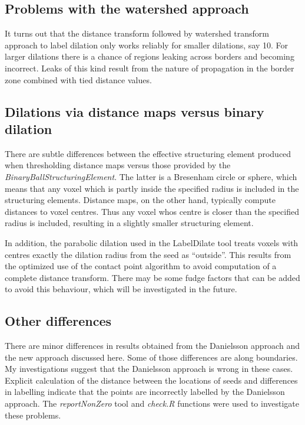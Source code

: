 \documentclass{InsightArticle}
\begin{document}
\subsection{Problems with the watershed approach}
It turns out that the distance transform followed by watershed
transform approach to label dilation only works reliably for smaller
dilations, say 10. For larger dilations there is a chance of regions
leaking across borders and becoming incorrect. Leaks of this kind
result from the nature of propagation in the border zone combined with
tied distance values. 

\subsection{Dilations via distance maps versus binary dilation}
There are subtle differences between the effective structuring element
produced when thresholding distance maps versus those provided by the
{\em BinaryBallStructuringElement}. The latter is a Bresenham circle
or sphere, which means that any voxel which is partly inside the
specified radius is included in the structuring elements. Distance
maps, on the other hand, typically compute distances to voxel
centres. Thus any voxel whos centre is closer than the specified
radius is included, resulting in a slightly smaller structuring
element. 

In addition, the parabolic dilation used in the LabelDilate tool
treats voxels with centres exactly the dilation radius from the seed
as ``outside''. This results from the optimized use of the contact
point algorithm to avoid computation of a complete distance
transform. There may be some fudge factors that can be added to avoid
this behaviour, which will be investigated in the future.

\subsection{Other differences}
There are minor differences in results obtained from the Danielsson
approach and the new approach discussed here. Some of those
differences are along boundaries. My investigations suggest that the
Danielsson approach is wrong in these cases. Explicit calculation of
the distance between the locations of seeds and differences in
labelling indicate that the points are incorrectly labelled by the
Danielsson approach. The {\em reportNonZero} tool and {\em check.R}
functions were used to investigate these problems.
\end{document}

